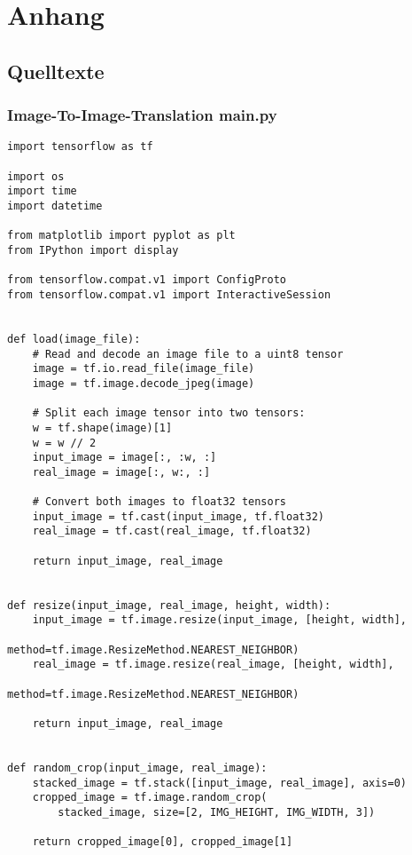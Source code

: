 \part*{Anhang}

\chapter{Quelltexte}
\label{ch:a_sim}

\section{Image-To-Image-Translation main.py}
\label{pix2pixpy}

\begin{lstlisting}
import tensorflow as tf

import os
import time
import datetime

from matplotlib import pyplot as plt
from IPython import display

from tensorflow.compat.v1 import ConfigProto
from tensorflow.compat.v1 import InteractiveSession


def load(image_file):
    # Read and decode an image file to a uint8 tensor
    image = tf.io.read_file(image_file)
    image = tf.image.decode_jpeg(image)

    # Split each image tensor into two tensors:
    w = tf.shape(image)[1]
    w = w // 2
    input_image = image[:, :w, :]
    real_image = image[:, w:, :]

    # Convert both images to float32 tensors
    input_image = tf.cast(input_image, tf.float32)
    real_image = tf.cast(real_image, tf.float32)

    return input_image, real_image


def resize(input_image, real_image, height, width):
    input_image = tf.image.resize(input_image, [height, width],
                                  method=tf.image.ResizeMethod.NEAREST_NEIGHBOR)
    real_image = tf.image.resize(real_image, [height, width],
                                 method=tf.image.ResizeMethod.NEAREST_NEIGHBOR)

    return input_image, real_image


def random_crop(input_image, real_image):
    stacked_image = tf.stack([input_image, real_image], axis=0)
    cropped_image = tf.image.random_crop(
        stacked_image, size=[2, IMG_HEIGHT, IMG_WIDTH, 3])

    return cropped_image[0], cropped_image[1]



\end{lstlisting}
